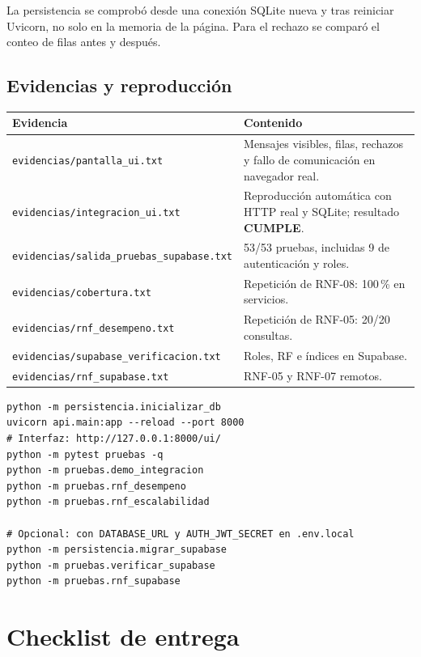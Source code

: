 \documentclass[11pt,a4paper]{article}
\newcommand{\code}[1]{\texttt{#1}}
\newcommand{\thead}[1]{\textbf{#1}}
\begin{document}
La persistencia se comprobó desde una conexión SQLite nueva y tras reiniciar
Uvicorn, no solo en la memoria de la página. Para el rechazo se comparó el
conteo de filas antes y después.

\subsection{Evidencias y reproducción}

{\footnotesize
\begin{tabularx}{\linewidth}{@{}V{0.7}V{1.3}@{}}
\toprule
\thead{Evidencia} & \thead{Contenido} \\ \midrule
\code{evidencias/pantalla\_ui.txt} & Mensajes visibles, filas, rechazos y fallo
de comunicación en navegador real. \\
\code{evidencias/integracion\_ui.txt} & Reproducción automática con HTTP real y
SQLite; resultado \textbf{CUMPLE}. \\
\code{evidencias/salida\_pruebas\_supabase.txt} & 53/53 pruebas, incluidas 9 de
autenticación y roles. \\
\code{evidencias/cobertura.txt} & Repetición de RNF-08: 100\,\% en servicios. \\
\code{evidencias/rnf\_desempeno.txt} & Repetición de RNF-05: 20/20 consultas. \\
\code{evidencias/supabase\_verificacion.txt} & Roles, RF e índices en Supabase. \\
\code{evidencias/rnf\_supabase.txt} & RNF-05 y RNF-07 remotos. \\
\bottomrule
\end{tabularx}
}

\begin{lstlisting}
python -m persistencia.inicializar_db
uvicorn api.main:app --reload --port 8000
# Interfaz: http://127.0.0.1:8000/ui/
python -m pytest pruebas -q
python -m pruebas.demo_integracion
python -m pruebas.rnf_desempeno
python -m pruebas.rnf_escalabilidad

# Opcional: con DATABASE_URL y AUTH_JWT_SECRET en .env.local
python -m persistencia.migrar_supabase
python -m pruebas.verificar_supabase
python -m pruebas.rnf_supabase
\end{lstlisting}

\clearpage

\section{Checklist de entrega}
\end{document}
